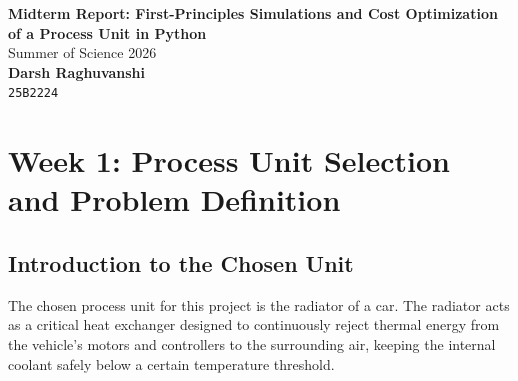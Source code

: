 \documentclass[12pt, a4paper]{article}
\begin{document}
\begin{titlepage}
    \vspace*{\fill} 
    
    \begin{center}
        {\LARGE \textbf{Midterm Report: First-Principles Simulations and Cost Optimization of a Process Unit in Python}}\\[1.5cm]
        
        {\Large Summer of Science 2026}\\[2cm]
        
        {\large \textbf{Darsh Raghuvanshi}} \\
        {\large \texttt{25B2224}}
    \end{center}
    
    \vspace*{\fill}
\end{titlepage}

\setcounter{page}{2}

\newpage

\begin{abstract}
This midterm report documents the progress made during the first four weeks of the Summer of Science (SOS) project. The primary focus of Phase I has been establishing a foundational understanding of process modeling, solving ordinary differential equations (ODEs), and developing a digital twin for a specific process unit. The chosen unit for this study is a car radiator. This report outlines the mathematical formulation of the governing equations, the implementation of numerical methods (Euler and Runge-Kutta 4) in Python, and the initial dynamic simulations of the unit.
\end{abstract}
\newpage

\tableofcontents
\newpage

\section{Week 1: Process Unit Selection and Problem Definition}

\subsection{Introduction to the Chosen Unit}
The chosen process unit for this project is the radiator of a car. The radiator acts as a critical heat exchanger designed to continuously reject thermal energy from the vehicle's motors and controllers to the surrounding air, keeping the internal coolant safely below a certain temperature threshold. 
\end{document}
